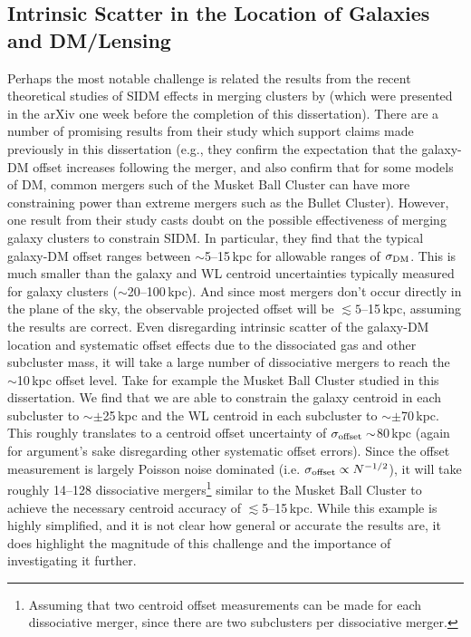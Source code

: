 \subsection{Intrinsic Scatter in the Location of Galaxies and DM/Lensing}

Perhaps the most notable challenge is related the results from the recent theoretical studies of SIDM effects in merging clusters by \citet{Kahlhoefer:2013wp} (which were presented in the arXiv one week before the completion of this dissertation).
There are a number of promising results from their study which support claims made previously in this dissertation (e.g., they confirm the expectation that the galaxy-DM offset increases following the merger, and also confirm that for some models of DM, common mergers such of the Musket Ball Cluster can have more constraining power than extreme mergers such as the Bullet Cluster).
However, one result from their study casts doubt on the possible effectiveness of merging galaxy clusters to constrain SIDM.
In particular, they find that the typical galaxy-DM offset ranges between $\sim$5--15\,kpc for allowable ranges of $\sigma_{\rm DM}$.
This is much smaller than the galaxy and WL centroid uncertainties typically measured for galaxy clusters ($\sim$20--100\,kpc).
And since most mergers don't occur directly in the plane of the sky, the observable projected offset will be $\lesssim5$--15\,kpc, assuming the \citet{Kahlhoefer:2013wp} results are correct.
Even disregarding intrinsic scatter of the galaxy-DM location and systematic offset effects due to the dissociated gas and other subcluster mass, it will take a large number of dissociative mergers to reach the $\sim$10\,kpc offset level.
Take for example the Musket Ball Cluster studied in this dissertation.
We find that we are able to constrain the galaxy centroid in each subcluster to $\sim\pm$25\,kpc and the WL centroid in each subcluster to $\sim\pm$70\,kpc.
This roughly translates to a centroid offset uncertainty of $\sigma_{\rm offset}\sim$80\,kpc (again for argument's sake disregarding other systematic offset errors).
Since the offset measurement is largely Poisson noise dominated (i.e. $\sigma_{\rm offset}\propto N^{-1/2}$), it will take roughly 14--128 dissociative mergers\footnote{Assuming that two centroid offset measurements can be made for each dissociative merger, since there are two subclusters per dissociative merger.} similar to the Musket Ball Cluster to achieve the necessary centroid accuracy of $\lesssim$5--15\,kpc.
While this example is highly simplified, and it is not clear how general or accurate the \citet{Kahlhoefer:2013wp} results are,  it does highlight the magnitude of this challenge and the importance of investigating it further.

